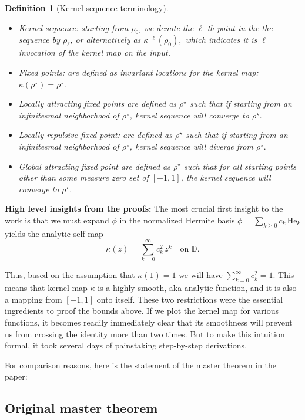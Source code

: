 \documentclass[11pt]{article}
\newtheorem{definition}{Definition}
\begin{document}
\begin{definition}[Kernel sequence terminology]
\begin{itemize}
\item {Kernel sequence}: starting from $\rho_0$, we denote the $\ell$-th point in the the sequence by $\rho_\ell$, or alternatively as $\kappa^{\circ \ell}(\rho_0),$ which indicates it is $\ell$ invocation of the kernel map on the input.
\item {Fixed points}: are defined as invariant locations for the kernel map: $\kappa(\rho^\star) = \rho^\star.$
\item {Locally attracting fixed points} are defined as $\rho^\star$ such that if starting from an infinitesmal neighborhood of $\rho^\star$, kernel sequence will converge to $\rho^\star.$
\item {Locally repulsive fixed point}: are defined as $\rho^\star$ such that if starting from an infinitesmal neighborhood of $\rho^\star$, kernel sequence will diverge from $\rho^\star.$
\item {Global attracting fixed point} are defined as $\rho^\star$ such that for all starting points other than some measure zero set of $[-1,1]$, the kernel sequence will converge to $\rho^\star.$
\end{itemize}
\end{definition}

\textbf{High level insights from the proofs:} The most crucial first insight to the work is that we must expand $\phi$ in the normalized Hermite basis $\phi=\sum_{k\geq0} c_k\,\mathrm{He}_k$ yields the analytic self-map
\begin{equation}
\kappa(z) = \sum_{k=0}^\infty c_k^2\, z^k \quad \text{on } \mathbb{D}.
\end{equation}

Thus, based on the assumption that $\kappa(1)=1$ we will have $\sum_{k=0}^\infty c_k^2 = 1.$ This means that kernel map $\kappa$ is a highly smooth, aka analytic function, and it is also a mapping from $[-1,1]$ onto itself. These two restrictions were the essential ingredients to proof the bounds above. If we plot the kernel map for various functions, it becomes readily immediately clear that its smoothness will prevent us from crossing the identity more than two times. But to make this intuition formal, it took several days of painstaking step-by-step derivations.

For comparison reasons, here is the statement of the master theorem in the paper:

\subsection{Original master theorem}
\end{document}
